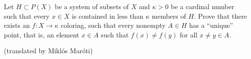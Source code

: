 Let $H \subset P(X)$ be a system of subsets of $X$ and $\kappa > 0$ be a cardinal number such that every $x \in X$ is contained in less than $\kappa$ members of $H$. Prove that there exists an $f \colon X \rightarrow \kappa$ coloring, such that every nonempty $A \in H$ has a “unique” point, that is, an element $x \in A$ such that $f(x) \neq f(y)$ for all $x \neq y \in A$.

(translated by Miklós Maróti)